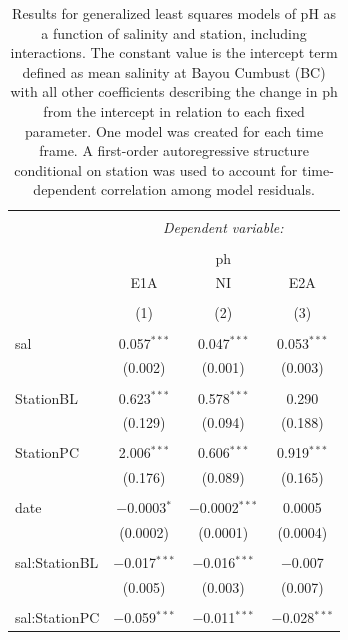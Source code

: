\documentclass[letterpaper,12pt]{article}\usepackage[]{graphicx}\usepackage[]{color}
\begin{document}
\begin{table}[!htbp] \centering 
  \caption{Results for generalized least squares models of pH as a function of salinity and station, including interactions.  The constant value is the intercept term defined as mean salinity at Bayou Cumbust (BC) with all other coefficients describing the change in ph from the intercept in relation to each fixed parameter.  One model was created for each time frame.  A first-order autoregressive structure conditional on station was used to account for time-dependent correlation among model residuals.} 
  \label{} 
\begin{tabular}{@{\extracolsep{5pt}}lccc} 
\\[-1.8ex]\hline 
\hline \\[-1.8ex] 
 & \multicolumn{3}{c}{\textit{Dependent variable:}} \\ 
\cline{2-4} 
\\[-1.8ex] & \multicolumn{3}{c}{ph} \\ 
 & E1A & NI & E2A \\ 
\\[-1.8ex] & (1) & (2) & (3)\\ 
\hline \\[-1.8ex] 
 sal & 0.057$^{***}$ & 0.047$^{***}$ & 0.053$^{***}$ \\ 
  & (0.002) & (0.001) & (0.003) \\ 
  & & & \\ 
 StationBL & 0.623$^{***}$ & 0.578$^{***}$ & 0.290 \\ 
  & (0.129) & (0.094) & (0.188) \\ 
  & & & \\ 
 StationPC & 2.006$^{***}$ & 0.606$^{***}$ & 0.919$^{***}$ \\ 
  & (0.176) & (0.089) & (0.165) \\ 
  & & & \\ 
 date & $-$0.0003$^{*}$ & $-$0.0002$^{***}$ & 0.0005 \\ 
  & (0.0002) & (0.0001) & (0.0004) \\ 
  & & & \\ 
 sal:StationBL & $-$0.017$^{***}$ & $-$0.016$^{***}$ & $-$0.007 \\ 
  & (0.005) & (0.003) & (0.007) \\ 
  & & & \\ 
 sal:StationPC & $-$0.059$^{***}$ & $-$0.011$^{***}$ & $-$0.028$^{***}$ \\ 

\end{tabular}
\end{table}
\end{document}
